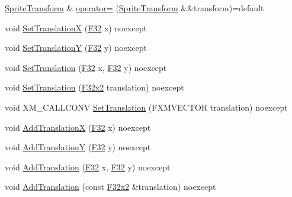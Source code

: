\begin{DoxyCompactItemize}
\mbox{\hyperlink{classmage_1_1_sprite_transform}{Sprite\+Transform}} \& \mbox{\hyperlink{classmage_1_1_sprite_transform_a9278d3fd0a6d346b188515b67a1adfc2}{operator=}} (\mbox{\hyperlink{classmage_1_1_sprite_transform}{Sprite\+Transform}} \&\&transform)=default
\item 
void \mbox{\hyperlink{classmage_1_1_sprite_transform_aa30ede51f36c31b5a35ebe7b60545e1c}{Set\+TranslationX}} (\mbox{\hyperlink{namespacemage_aa97e833b45f06d60a0a9c4fc22ae02c0}{F32}} x) noexcept
\item 
void \mbox{\hyperlink{classmage_1_1_sprite_transform_a3086df30d1ed6813db07bc78ef47df6c}{Set\+TranslationY}} (\mbox{\hyperlink{namespacemage_aa97e833b45f06d60a0a9c4fc22ae02c0}{F32}} y) noexcept
\item 
void \mbox{\hyperlink{classmage_1_1_sprite_transform_a9fb2d4e0f332c316c8f2d07f482f40a5}{Set\+Translation}} (\mbox{\hyperlink{namespacemage_aa97e833b45f06d60a0a9c4fc22ae02c0}{F32}} x, \mbox{\hyperlink{namespacemage_aa97e833b45f06d60a0a9c4fc22ae02c0}{F32}} y) noexcept
\item 
void \mbox{\hyperlink{classmage_1_1_sprite_transform_adc47b798331d5e61d158fb4f00d37084}{Set\+Translation}} (\mbox{\hyperlink{namespacemage_a9dc0d34d6ecc87e4cfa4a826102117bc}{F32x2}} translation) noexcept
\item 
void X\+M\+\_\+\+C\+A\+L\+L\+C\+O\+NV \mbox{\hyperlink{classmage_1_1_sprite_transform_a597ef325d25183a969915be48d0a99f7}{Set\+Translation}} (F\+X\+M\+V\+E\+C\+T\+OR translation) noexcept
\item 
void \mbox{\hyperlink{classmage_1_1_sprite_transform_a040bd05b911dbe199c3eab6f6811ce5b}{Add\+TranslationX}} (\mbox{\hyperlink{namespacemage_aa97e833b45f06d60a0a9c4fc22ae02c0}{F32}} x) noexcept
\item 
void \mbox{\hyperlink{classmage_1_1_sprite_transform_ab45b391a7bdc357facd0eb322e0a294f}{Add\+TranslationY}} (\mbox{\hyperlink{namespacemage_aa97e833b45f06d60a0a9c4fc22ae02c0}{F32}} y) noexcept
\item 
void \mbox{\hyperlink{classmage_1_1_sprite_transform_a567a3bd6476151f65d8ca62f818bba45}{Add\+Translation}} (\mbox{\hyperlink{namespacemage_aa97e833b45f06d60a0a9c4fc22ae02c0}{F32}} x, \mbox{\hyperlink{namespacemage_aa97e833b45f06d60a0a9c4fc22ae02c0}{F32}} y) noexcept
\item 
void \mbox{\hyperlink{classmage_1_1_sprite_transform_a3254ef538066d0005f4168a40f23300d}{Add\+Translation}} (const \mbox{\hyperlink{namespacemage_a9dc0d34d6ecc87e4cfa4a826102117bc}{F32x2}} \&translation) noexcept
\item 

\end{DoxyCompactItemize}
